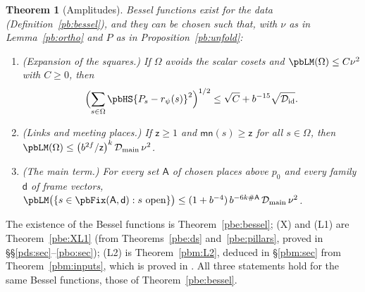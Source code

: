 \documentclass[10pt]{amsart}
\newtheorem{theorem}{Theorem}[section]
\theoremstyle{definition}
\theoremstyle{remark}
\providecommand{\pbDid}{\mathcal D_{\mathrm{id}}}
\providecommand{\pbDmain}{\mathcal D_{\mathrm{main}}}
\providecommand{\pbrpsi}{r_\psi}
\begin{document}
\begin{theorem}[Amplitudes]\label{pb:amp}
Bessel functions exist for the data (Definition~\ref{pb:bessel}), and they can be chosen such
that, with $\nu$ as in Lemma~\ref{pb:ortho} and $P$ as in Proposition~\ref{pb:unfold}:
\begin{enumerate}
\item[(X)] \emph{(Expansion of the squares.)} If $\Omega$ avoids the scalar cosets and $\pbLM(
\Omega)\le C\nu^2$ with $C\ge0$, then
\[
\Bigl(\sum_{s\in\Omega}\pbHS{P_s-\pbrpsi(s)}^2\Bigr)^{1/2}\le\sqrt C+b^{-15}\sqrt{\pbDid} .
\]
\item[(L1)] \emph{(Links and meeting places.)} If $\mathsf z\ge1$ and $\mathsf{mn}(s)\ge\mathsf z$
for all $s\in\Omega$, then $\pbLM(\Omega)\le\bigl(b^{2f}/\mathsf z\bigr)^k\,\pbDmain\,\nu^2$.
\item[(L2)] \emph{(The main term.)} For every set $\mathsf A$ of chosen places above $p_0$ and every
family $\mathsf d$ of frame vectors,
$\pbLM\bigl(\{s\in\pbFix(\mathsf A,\mathsf d):s\text{ open}\}\bigr)\le(1+b^{-4})\,b^{-6k\#\mathsf A}\,
\pbDmain\,\nu^2$.
\end{enumerate}
\end{theorem}
\smallskip\noindent The existence of the Bessel functions is Theorem~\ref{pbe:bessel}; {\rm(X)} and
{\rm(L1)} are Theorem~\ref{pbe:XL1} (from Theorems~\ref{pbe:ds} and~\ref{pbe:pillars}, proved in
\S\S\ref{pds:sec}--\ref{pbo:sec}); {\rm(L2)} is Theorem~\ref{pbm:L2}, deduced in \S\ref{pbm:sec} from
Theorem~\ref{pbm:inputs}, which is proved in {\cite[\S\S2--6]{P52}}. All three statements hold
for the same Bessel functions, those of Theorem~\ref{pbe:bessel}.\par\smallskip
\end{document}
